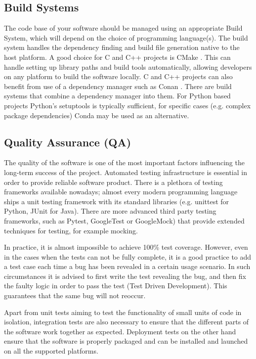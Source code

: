\documentclass[jnr]{iosart2x}
\begin{document}
\subsection{Build Systems}
\label{Build systems}

The code base of your software should be managed using an appropriate Build System, which will depend on the choice of programming language(s).
The build system handles the dependency finding and build file generation native to the host platform.
A good choice for C and C++ projects is CMake \cite{CMake}.
This can handle setting up library paths and build tools automatically, allowing developers on any platform to build the software locally.
C and C++ projects can also benefit from use of a dependency manager such as Conan \cite{Conan}.
There are build systems that combine a dependency manager into them.
For Python based projects Python's setuptools is typically sufficient, for specific cases (e.g. complex package dependencies) Conda may be used as an alternative.

\subsection{Quality Assurance (QA)}
\label{Quality assurance}

The quality of the software is one of the most important factors influencing the long-term success of the project.
Automated testing infrastructure is essential in order to provide reliable software product.
There is a plethora of testing frameworks available nowadays; almost every modern programming language ships a unit testing framework with its standard libraries (e.g. {\sc unittest} for {\sc Python}, {\sc JUnit} for {\sc Java}).
There are more advanced third party testing frameworks, such as {\sc Pytest}, {\sc GoogleTest} or {\sc GoogleMock}) that provide extended techniques for testing, for example mocking.

In practice, it is almost impossible to achieve 100\% test coverage.
However, even in the cases when the tests can not be fully complete, it is a good practice to add a test case each time a bug has been revealed in a certain usage scenario.
In such circumstances it is advised to first write the test revealing the bug, and then fix the faulty logic in order to pass the test (Test Driven Development).
This guarantees that the same bug will not reoccur.

Apart from unit tests aiming to test the functionality of small units of code in isolation, integration tests are also necessary to ensure that the different parts of the software work together as expected.
Deployment tests on the other hand ensure that the software is properly packaged and can be installed and launched on all the supported platforms.
\end{document}
